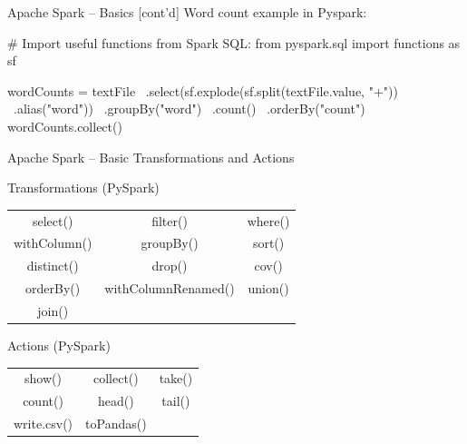 \documentclass[ignorenonframetext,xcolor=x11names]{beamer}
\begin{document}


\begin{frame}[fragile]{Apache Spark -- Basics \small [cont'd]}
Word count example in Pyspark:
\begin{pythoncode}
# Import useful functions from Spark SQL:
from pyspark.sql import functions as sf

wordCounts = textFile \
    .select(sf.explode(sf.split(textFile.value, "\s+")) \
        .alias("word")) \
    .groupBy("word") \
    .count() \
    .orderBy("count")
wordCounts.collect()
\end{pythoncode}
\end{frame}

\begin{frame}{Apache Spark -- Basic Transformations and Actions}
\begin{block}{Transformations (PySpark)}
\centering
\renewcommand{\arraystretch}{1.5}
\begin{tabular}{ccc} 
select() & filter() & where() \\
withColumn() & groupBy() & sort() \\
distinct() & drop() & cov() \\
orderBy() & withColumnRenamed() & union() \\
join()  \\
\end{tabular}
\end{block}

\begin{block}{Actions (PySpark)}
\centering
\renewcommand{\arraystretch}{1.5}
\begin{tabular}{ccc} 
show() & collect() & take() \\
count() & head() & tail() \\
write.csv() & toPandas() & \\
\end{tabular}
\end{block}
\end{frame}
\end{document}
